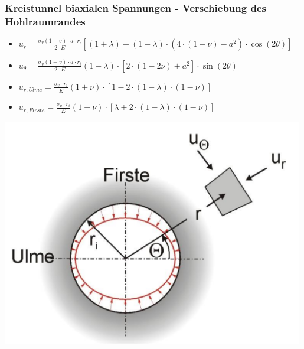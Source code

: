 \documentclass[fleqn,twoside]{article}
\begin{document}
\subsubsection{Kreistunnel biaxialen Spannungen - Verschiebung des Hohlraumrandes}
\begin{minipage}{0.72\textwidth}
\begin{itemize}
	\item $u_r = \frac{\sigma_v(1+v)\cdot a\cdot r_i}{2\cdot E}[(1+\lambda)-(1-\lambda)\cdot(4\cdot(1-\nu)-a^2)\cdot\cos(2\theta)]$
	\item $u_\theta = \frac{\sigma_v(1+v)\cdot a\cdot r_i}{2\cdot E}(1-\lambda)\cdot[2\cdot(1-2\nu)+a^2]\cdot \sin(2\theta)$
	\item $u_{r,Ulme}=\frac{\sigma_v \cdot r_i}{E}(1+\nu)\cdot[1-2\cdot(1-\lambda)\cdot(1-\nu)]$
	\item $u_{r,Firste}=\frac{\sigma_v \cdot r_i}{E}(1+\nu)\cdot[\lambda+2\cdot(1-\lambda)\cdot(1-\nu)]$
\end{itemize}
\end{minipage}
\begin{minipage}{0.27\textwidth}
    \includegraphics[width=0.99\textwidth]{Grafiken/Kreistunnel_biaxiale_Verschiebungen.png}
\end{minipage}
\end{document}
